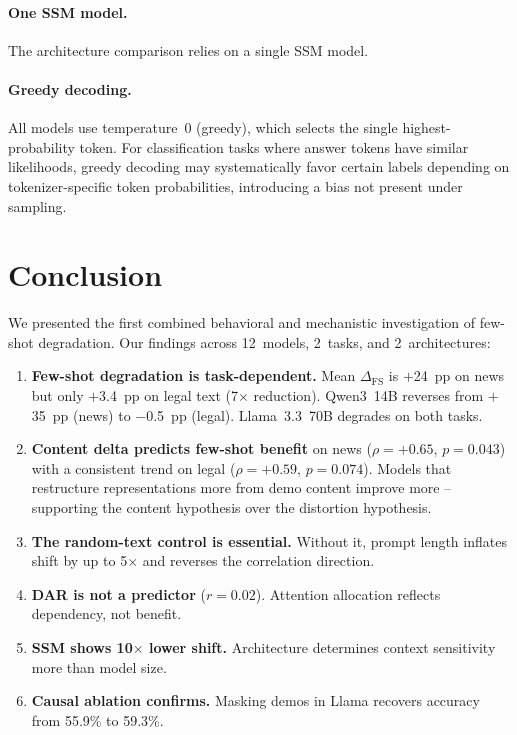 \documentclass[11pt,a4paper]{article}
\begin{document}
\paragraph{One SSM model.} The architecture comparison relies on a single SSM model.

\paragraph{Greedy decoding.} All models use temperature~0 (greedy), which selects the single highest-probability token. For classification tasks where answer tokens have similar likelihoods, greedy decoding may systematically favor certain labels depending on tokenizer-specific token probabilities, introducing a bias not present under sampling.

\section{Conclusion}

We presented the first combined behavioral and mechanistic investigation of few-shot degradation. Our findings across 12~models, 2~tasks, and 2~architectures:

\begin{enumerate}[leftmargin=*]
    \item \textbf{Few-shot degradation is task-dependent.} Mean $\Delta_{\text{FS}}$ is $+$24~pp on news but only $+$3.4~pp on legal text (7$\times$ reduction). Qwen3~14B reverses from $+$35~pp (news) to $-$0.5~pp (legal). Llama~3.3~70B degrades on both tasks.

    \item \textbf{Content delta predicts few-shot benefit} on news ($\rho = +0.65$, $p = 0.043$) with a consistent trend on legal ($\rho = +0.59$, $p = 0.074$). Models that restructure representations more from demo content improve more -- supporting the content hypothesis over the distortion hypothesis.

    \item \textbf{The random-text control is essential.} Without it, prompt length inflates shift by up to 5$\times$ and reverses the correlation direction.

    \item \textbf{DAR is not a predictor} ($r = 0.02$). Attention allocation reflects dependency, not benefit.

    \item \textbf{SSM shows 10$\times$ lower shift.} Architecture determines context sensitivity more than model size.

    \item \textbf{Causal ablation confirms.} Masking demos in Llama recovers accuracy from 55.9\% to 59.3\%.
\end{enumerate}
\end{document}

